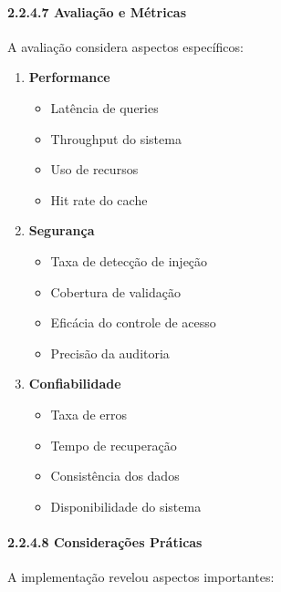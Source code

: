 \documentclass[
]{article}
\providecommand{\tightlist}{%
  \setlength{\itemsep}{0pt}\setlength{\parskip}{0pt}}
\begin{document}
\paragraph{2.2.4.7 Avaliação e
Métricas}\label{avaliauxe7uxe3o-e-muxe9tricas-2}

A avaliação considera aspectos específicos:

\begin{enumerate}
\def\labelenumi{\arabic{enumi}.}
\tightlist
\item
  \textbf{Performance}

  \begin{itemize}
  \tightlist
  \item
    Latência de queries
  \item
    Throughput do sistema
  \item
    Uso de recursos
  \item
    Hit rate do cache
  \end{itemize}
\item
  \textbf{Segurança}

  \begin{itemize}
  \tightlist
  \item
    Taxa de detecção de injeção
  \item
    Cobertura de validação
  \item
    Eficácia do controle de acesso
  \item
    Precisão da auditoria
  \end{itemize}
\item
  \textbf{Confiabilidade}

  \begin{itemize}
  \tightlist
  \item
    Taxa de erros
  \item
    Tempo de recuperação
  \item
    Consistência dos dados
  \item
    Disponibilidade do sistema
  \end{itemize}
\end{enumerate}

\paragraph{2.2.4.8 Considerações
Práticas}\label{considerauxe7uxf5es-pruxe1ticas-2}

A implementação revelou aspectos importantes:
\end{document}
